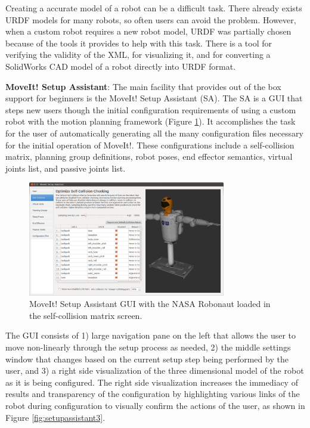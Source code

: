 \documentclass[10pt,journal,compsoc]{joser1}
\begin{document}
{Creating a accurate model of a robot can be a difficult task. There already exists URDF models for many robots, so often users can avoid the problem. However, when a custom robot requires a new robot model, URDF was partially chosen because of the tools it provides to help with this task. There is a tool for verifying the validity of the XML, for visualizing it, and for converting a SolidWorks CAD model of a robot directly into URDF format. 

{\bf MoveIt! Setup Assistant}: The main facility that provides out of the box support for beginners is the MoveIt! Setup Assistant (SA). The SA is a GUI that steps new users though the initial configuration requirements of using a custom robot with the motion planning framework (Figure \ref{fig:setupassistant}). It accomplishes the task for the user of automatically generating all the many configuration files necessary for the initial operation of MoveIt!. These configurations include a self-collision matrix, planning group definitions, robot poses, end effector semantics, virtual joints list, and passive joints list. 

\begin{figure}[!t]
\centering
\includegraphics[width=3.4in]{images/setup_assistant}
\caption{MoveIt! Setup Assistant GUI with the NASA Robonaut loaded in the self-collision matrix screen.}
\label{fig:setupassistant}
\end{figure}

The GUI consists of 1) large navigation pane on the left that allows the user to move non-linearly through the setup process as needed, 2) the middle settings window that changes based on the current setup step being performed by the user, and 3) a right side visualization of the three dimensional model of the robot as it is being configured. The right side visualization increases the immediacy of results and transparency of the configuration by highlighting various links of the robot during configuration to visually confirm the actions of the user, as shown in Figure \ref{fig:setupassistant3}.

}
\end{document}
